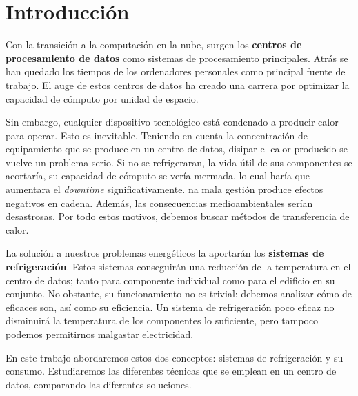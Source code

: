 


\chapter{Introducción}

Con la transición a la computación en la nube, surgen los \textbf{centros de procesamiento de datos} como sistemas de procesamiento principales. Atrás se han quedado los tiempos de los ordenadores personales como principal fuente de trabajo. El auge de estos centros de datos ha creado una carrera por optimizar la capacidad de cómputo por unidad de espacio. 

Sin embargo, cualquier dispositivo tecnológico está condenado a producir calor para operar. Esto es inevitable. Teniendo en cuenta la concentración de equipamiento que se produce en un centro de datos, disipar el calor producido se vuelve un problema serio. Si no se refrigeraran, la vida útil de sus componentes se acortaría, su capacidad de cómputo se vería mermada, lo cual haría que aumentara el \textit{downtime} significativamente. na mala gestión produce efectos negativos en cadena. Además, las consecuencias medioambientales serían desastrosas. Por todo estos motivos, debemos buscar métodos de transferencia de calor. 

La solución a nuestros problemas energéticos la aportarán los \textbf{sistemas de refrigeración}. Estos sistemas conseguirán una reducción de la temperatura en el centro de datos; tanto para componente individual como para el edificio en su conjunto. No obstante, su funcionamiento no es trivial: debemos analizar cómo de eficaces son, así como su eficiencia. Un sistema de refrigeración poco eficaz no disminuirá la temperatura de los componentes lo suficiente, pero tampoco podemos permitirnos malgastar electricidad. 

En este trabajo abordaremos estos dos conceptos: sistemas de refrigeración y su consumo. Estudiaremos las diferentes técnicas que se emplean en un centro de datos, comparando las diferentes soluciones.

